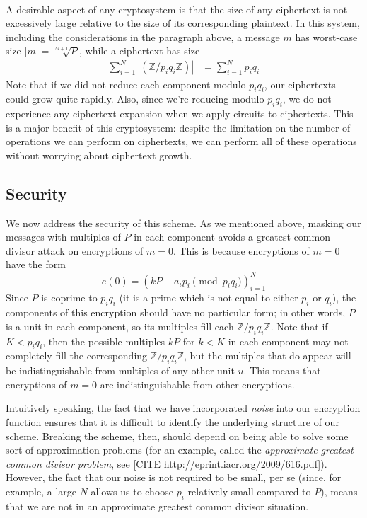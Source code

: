 \documentclass[11pt]{report}
\newcommand{\Z}{\mathbb{Z}}
\begin{document}
\

A desirable aspect of any cryptosystem is that the size of any ciphertext is not excessively large relative to the size of its corresponding plaintext. In this system, including the considerations in the paragraph above, a message $m$ has worst-case size $|m|=\sqrt[M+1]{P}$, while a ciphertext has size
\begin{align*}
\sum_{i=1}^N\left|(\Z/p_iq_i\Z)\right| &= \sum_{i=1}^Np_iq_i
\end{align*}
Note that if we did not reduce each component modulo $p_iq_i$, our ciphertexts could grow quite rapidly. Also, since we're reducing modulo $p_iq_i$, we do not experience any ciphertext expansion when we apply circuits to ciphertexts. This is a major benefit of this cryptosystem: despite the limitation on the number of operations we can perform on ciphertexts, we can perform all of these operations without worrying about ciphertext growth.


\subsection{Security}
\label{sec:cbe_security}
We now address the security of this scheme. As we mentioned above, masking our messages with multiples of $P$ in each component avoids a greatest common divisor attack on encryptions of $m=0$. This is because encryptions of $m=0$ have the form
\[ e(0) = (kP+a_ip_i \pmod{p_iq_i})_{i=1}^N \]
Since $P$ is coprime to $p_iq_i$ (it is a prime which is not equal to either $p_i$ or $q_i$), the components of this encryption should have no particular form; in other words, $P$ is a unit in each component, so its multiples fill each $\Z/p_iq_i\Z$. Note that if $K<p_iq_i$, then the possible multiples $kP$ for $k<K$ in each component may not completely fill the corresponding $\Z/p_iq_i\Z$, but the multiples that do appear will be indistinguishable from multiples of any other unit $u$. This means that encryptions of $m=0$ are indistinguishable from other encryptions.

Intuitively speaking, the fact that we have incorporated \emph{noise} into our encryption function ensures that it is difficult to identify the underlying structure of our scheme. Breaking the scheme, then, should depend on being able to solve some sort of  approximation problems (for an example, called the \emph{approximate greatest common divisor problem}, see [CITE http://eprint.iacr.org/2009/616.pdf]). However, the fact that our noise is not required to be small, per se (since, for example, a large $N$ allows us to choose $p_i$ relatively small compared to $P$), means that we are not in an approximate greatest common divisor situation.
\end{document}
